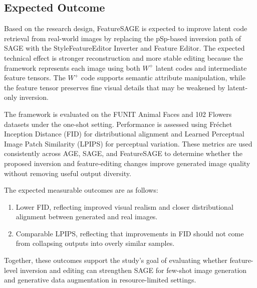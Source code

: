 \subsection{Expected Outcome}

Based on the research design, FeatureSAGE is expected to improve latent code retrieval from real-world images by replacing the pSp-based inversion path of SAGE with the StyleFeatureEditor Inverter and Feature Editor. The expected technical effect is stronger reconstruction and more stable editing because the framework represents each image using both $W^{+}$ latent codes and intermediate feature tensors. The $W^{+}$ code supports semantic attribute manipulation, while the feature tensor preserves fine visual details that may be weakened by latent-only inversion.

The framework is evaluated on the FUNIT Animal Faces and 102 Flowers datasets under the one-shot setting. Performance is assessed using Fr\'echet Inception Distance (FID) for distributional alignment and Learned Perceptual Image Patch Similarity (LPIPS) for perceptual variation. These metrics are used consistently across AGE, SAGE, and FeatureSAGE to determine whether the proposed inversion and feature-editing changes improve generated image quality without removing useful output diversity.

The expected measurable outcomes are as follows:

\begin{enumerate}
    \item Lower FID, reflecting improved visual realism and closer distributional alignment between generated and real images.
    \item Comparable LPIPS, reflecting that improvements in FID should not come from collapsing outputs into overly similar samples.
\end{enumerate}

Together, these outcomes support the study's goal of evaluating whether feature-level inversion and editing can strengthen SAGE for few-shot image generation and generative data augmentation in resource-limited settings.
